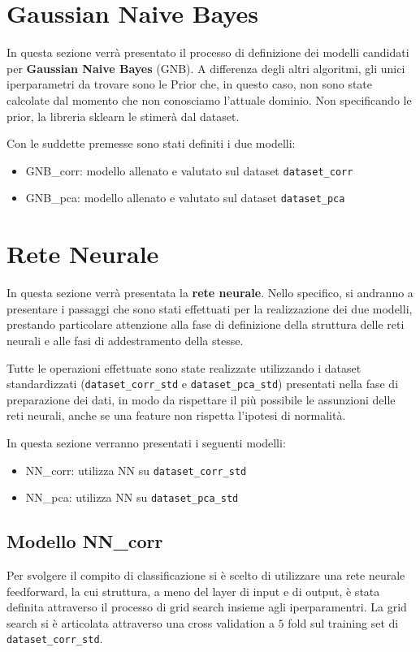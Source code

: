 \newpage
\section{Gaussian Naive Bayes}
In questa sezione verrà presentato il processo di definizione dei
modelli candidati per \textbf{Gaussian Naive Bayes} (GNB). A differenza
degli altri algoritmi, gli unici iperparametri da trovare sono le Prior che, in
questo caso, non sono state calcolate dal momento che non conosciamo l'attuale
dominio. Non specificando le prior, la libreria sklearn le stimerà dal dataset.

Con le suddette premesse sono stati definiti i due modelli:
\begin{itemize}
    \item GNB\_corr: modello allenato e valutato sul dataset \texttt{dataset\_corr}
    \item GNB\_pca: modello allenato e valutato sul dataset \texttt{dataset\_pca}
\end{itemize}

\section{Rete Neurale}
In questa sezione verrà presentata la \textbf{rete neurale}. Nello specifico, si
andranno a presentare i passaggi che sono stati effettuati per la realizzazione
dei due modelli, prestando particolare attenzione alla fase di definizione
della struttura delle reti neurali e alle fasi di addestramento della stesse.

Tutte le operazioni effettuate sono state realizzate utilizzando i dataset standardizzati
(\texttt{dataset\_corr\_std} e \texttt{dataset\_pca\_std}) presentati nella fase
di preparazione dei dati, in modo da rispettare il più possibile le assunzioni
delle reti neurali, anche se una feature non rispetta l'ipotesi di normalità.

In questa sezione verranno presentati i seguenti modelli:
\begin{itemize}
    \item NN\_corr: utilizza NN su \texttt{dataset\_corr\_std}
    \item NN\_pca: utilizza NN su \texttt{dataset\_pca\_std}
\end{itemize}

\subsection{Modello NN\_corr}
Per svolgere il compito di classificazione si è scelto di utilizzare una rete
neurale feedforward, la cui struttura, a meno del layer di input e di output, è
stata definita attraverso il processo di grid search insieme agli iperparamentri.
La grid search si è articolata attraverso una cross validation a $5$ fold sul training
set di \texttt{dataset\_corr\_std}.

